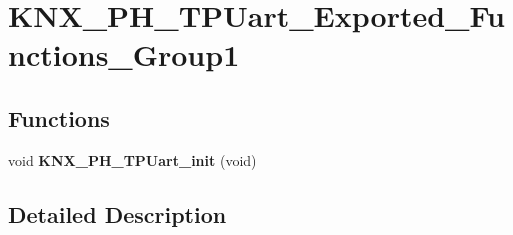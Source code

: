 \hypertarget{group___k_n_x___p_h___t_p_uart___exported___functions___group1}{}\section{K\+N\+X\+\_\+\+P\+H\+\_\+\+T\+P\+Uart\+\_\+\+Exported\+\_\+\+Functions\+\_\+\+Group1}
\label{group___k_n_x___p_h___t_p_uart___exported___functions___group1}
\subsection*{Functions}
\begin{DoxyCompactItemize}
\item 
void {\bfseries K\+N\+X\+\_\+\+P\+H\+\_\+\+T\+P\+Uart\+\_\+init} (void)\hypertarget{group___k_n_x___p_h___t_p_uart___exported___functions___group1_ga16a9f06a34687aa5102fcea5cb4062f7}{}\label{group___k_n_x___p_h___t_p_uart___exported___functions___group1_ga16a9f06a34687aa5102fcea5cb4062f7}

\end{DoxyCompactItemize}


\subsection{Detailed Description}
